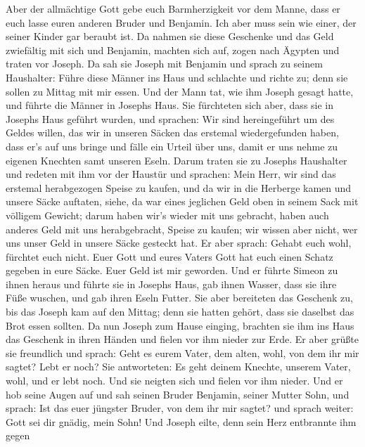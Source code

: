  Aber der allmächtige Gott gebe euch Barmherzigkeit vor dem
Manne, dass er euch lasse euren anderen Bruder und Benjamin. Ich aber
muss sein wie einer, der seiner Kinder gar beraubt ist.  Da
nahmen sie diese Geschenke und das Geld zwiefältig mit sich und
Benjamin, machten sich auf, zogen nach Ägypten und traten vor Joseph.
 Da sah sie Joseph mit Benjamin und sprach zu seinem
Haushalter: Führe diese Männer ins Haus und schlachte und richte zu;
denn sie sollen zu Mittag mit mir essen.  Und der Mann tat,
wie ihm Joseph gesagt hatte, und führte die Männer in Josephs Haus.
 Sie fürchteten sich aber, dass sie in Josephs Haus geführt
wurden, und sprachen: Wir sind hereingeführt um des Geldes willen, das
wir in unseren Säcken das erstemal wiedergefunden haben, dass er's auf
uns bringe und fälle ein Urteil über uns, damit er uns nehme zu eigenen
Knechten samt unseren Eseln.  Darum traten sie zu Josephs
Haushalter und redeten mit ihm vor der Haustür  und
sprachen: Mein Herr, wir sind das erstemal herabgezogen Speise zu
kaufen,  und da wir in die Herberge kamen und unsere Säcke
auftaten, siehe, da war eines jeglichen Geld oben in seinem Sack mit
völligem Gewicht; darum haben wir's wieder mit uns gebracht,
 haben auch anderes Geld mit uns herabgebracht, Speise zu
kaufen; wir wissen aber nicht, wer uns unser Geld in unsere Säcke
gesteckt hat.  Er aber sprach: Gehabt euch wohl, fürchtet
euch nicht. Euer Gott und eures Vaters Gott hat euch einen Schatz
gegeben in eure Säcke. Euer Geld ist mir geworden. Und er führte Simeon
zu ihnen heraus  und führte sie in Josephs Haus, gab ihnen
Wasser, dass sie ihre Füße wuschen, und gab ihren Eseln Futter.
 Sie aber bereiteten das Geschenk zu, bis das Joseph kam
auf den Mittag; denn sie hatten gehört, dass sie daselbst das Brot essen
sollten.  Da nun Joseph zum Hause einging, brachten sie ihm
ins Haus das Geschenk in ihren Händen und fielen vor ihm nieder zur
Erde.  Er aber grüßte sie freundlich und sprach: Geht es
eurem Vater, dem alten, wohl, von dem ihr mir sagtet? Lebt er noch?
 Sie antworteten: Es geht deinem Knechte, unserem Vater,
wohl, und er lebt noch. Und sie neigten sich und fielen vor ihm nieder.
 Und er hob seine Augen auf und sah seinen Bruder Benjamin,
seiner Mutter Sohn, und sprach: Ist das euer jüngster Bruder, von dem
ihr mir sagtet? und sprach weiter: Gott sei dir gnädig, mein Sohn!
 Und Joseph eilte, denn sein Herz entbrannte ihm gegen
